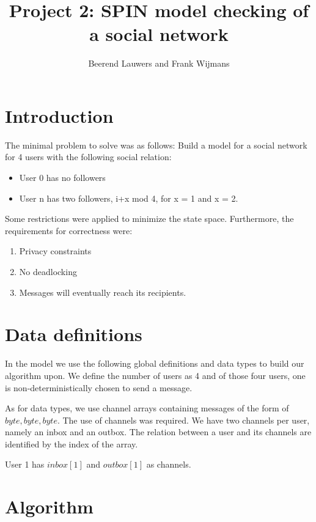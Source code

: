 \documentclass[9pt,a4paper]{article}
\author{Beerend Lauwers and Frank Wijmans}
\title{Project 2: SPIN model checking of a social network}
\begin{document}
	\maketitle
	
	\section{Introduction}
	
	The minimal problem to solve was as follows:
	Build a model for a social network for 4 users with the following social relation:
	\begin{itemize}
		\item User 0 has no followers
		\item User n has two followers, i+x mod 4, for x = 1 and x = 2.
	\end{itemize}
	
	Some restrictions were applied to minimize the state space.
	Furthermore, the requirements for correctness were:
	\begin{enumerate}
		\item Privacy constraints
		\item No deadlocking
		\item Messages will eventually reach its recipients.
	\end{enumerate}
	
	\section{Data definitions}
	In the model we use the following global definitions and data types to build our algorithm upon.
	We define the number of users as 4 and of those four users, one is non-deterministically chosen to send a message.
	
	As for data types, we use channel arrays containing messages of the form of ${byte, byte, byte}$.
	The use of channels was required. 
	We have two channels per user, namely an inbox and an outbox.
	The relation between a user and its channels are identified by the index of the array.
	\begin{center}
		User 1 has $inbox[1]$ and $outbox[1]$ as channels.
	\end{center}
	
	\section{Algorithm}
	
\end{document}

